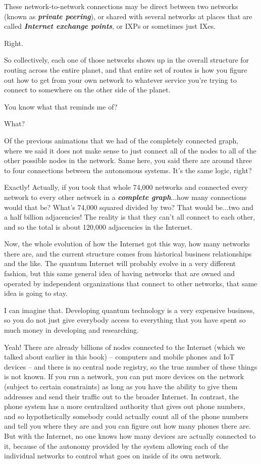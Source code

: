These network-to-network connections may be direct between two networks (known as \textbf{\emph{private peering}}), or shared with several networks at places that are called \textbf{\emph{Internet exchange points}}, or IXPs or sometimes just IXes.

\mmm Right.

\rrr So collectively, each one of those networks shows up in the overall structure for routing across the entire planet, and that entire set of routes is how you figure out how to get from your own network to whatever service you're trying to connect to somewhere on the other side of the planet.

\mmm You know what that reminds me of? 

\rrr What?

\mmm Of the previous animations that we had of the completely connected graph, where we said it does not make sense to just connect all of the nodes to all of the other possible nodes in the network. Same here, you said there are around three to four connections between the autonomous systems. It's the same logic, right?

\rrr Exactly! Actually, if you took that whole 74,000 networks and connected every network to every other network in a \textbf{\emph{complete graph}}...how many connections would that be?  What's 74,000 squared divided by two? That would be...two and a half billion adjacencies!  The reality is that they can't all connect to each other, and so the total is about 120,000 adjacencies in the Internet.

Now, the whole evolution of how the Internet got this way, how many networks there are, and the current structure comes from historical business relationships and the like. The quantum Internet will probably evolve in a very different fashion, but this same general idea of having networks that are owned and operated by independent organizations that connect to other networks, that same idea is going to stay.

\mmm I can imagine that.
Developing quantum technology is a very expensive business, so you do not just give everybody access to everything that you have spent so much money in developing and researching.

\rrr Yeah! There are already billions of nodes connected to the Internet (which we talked about earlier in this book) -- computers and mobile phones and IoT devices -- and there is no central node registry, so the true number of these things is not known. If you run a network, you can put more devices on the network (subject to certain constraints) as long as you have the ability to give them addresses and send their traffic out to the broader Internet. In contrast, the phone system has a more centralized authority that gives out phone numbers, and so hypothetically somebody could actually count all of the phone numbers and tell you where they are and you can figure out how many phones there are.  But with the Internet, no one knows how many devices are actually connected to it, because of the autonomy provided by the system allowing each of the individual networks to control what goes on inside of its own network.

